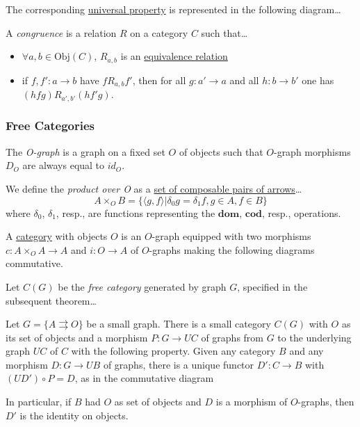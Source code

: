 \noindent The corresponding \hyperref[universality]{universal property} is represented in the following diagram\dots



\label{congruence}
A \emph{congruence} is a relation $R$ on a category $C$ such that\dots
\begin{itemize}
  \item $\forall a,b \in \text{Obj}(C)$, $R_{a,b}$ is an \hyperref[equivalencerelation]{equivalence relation}
  \item if $f,f':a \rightarrow b$ have $f R_{a,b} f'$, then for all $g: a' \rightarrow a$ and all $h: b \rightarrow b'$ one has $(hfg)R_{a',b'}(hf'g)$.
\end{itemize}

\subsubsection{Free Categories}\label{freecategories}

\label{ograph}
The \emph{O-graph} is a graph on a fixed set $O$ of objects such that $O$-graph morphisms $D_O$ are always equal to $id_O$.\newline

\noindent We define the \emph{product over O} as a \hyperref[composablepairsofarrows]{set of composable pairs of arrows}\dots
$$A \times_O B = \{ \langle g, f \rangle | \delta_0 g = \delta_1 f, g \in A, f \in B \}$$
where $\delta_0$, $\delta_1$, resp., are functions representing the $\textbf{dom}$, $\textbf{cod}$, resp., operations.\newline

\noindent A \hyperref[category]{category} with objects $O$ is an $O$-graph equipped with two morphisms $c:A \times_O A \rightarrow A$ and $i:O \rightarrow A$
of $O$-graphs making the following diagrams commutative.



\label{freecategory}

Let $C(G)$ be the \emph{free category} generated by graph $G$, specified in the subsequent theorem\dots

\begin{theorem}
Let $G = \{A \rightrightarrows O\}$ be a small graph. There is a small category $C(G)$ with $O$ as its set of objects and a morphism $P: G \rightarrow UC$ of graphs from $G$ to
the underlying graph $UC$ of $C$ with the following property. Given any category $B$ and any morphism $D:G \rightarrow UB$ of graphs, there is a unique functor $D':C \rightarrow B$
with $(UD') \circ P = D$, as in the commutative diagram

\begin{figure}[H]
\centering

\end{figure}

In particular, if $B$ had $O$ as set of objects and $D$ is a morphism of $O$-graphs, then $D'$ is the identity on objects.
\end{theorem}

